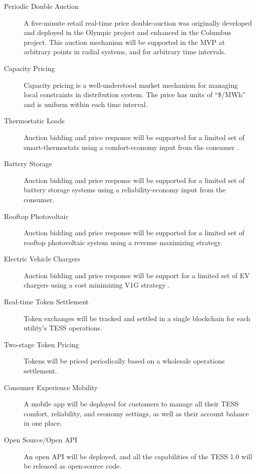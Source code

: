 \documentclass[10pt,twocolumn]{article}
\begin{document}
\begin{description}

    \item[Periodic Double Auction] A five-minute retail real-time price double-auction was originally developed and deployed in the Olympic project and enhanced in the Columbus project. This auction mechanism will be supported in the MVP at arbitrary points in radial systems, and for arbitrary time intervals.
    
    \item[Capacity Pricing] Capacity pricing is a well-understood market mechanism for managing local constraints in distribution system.  The price has units of ``\$/MWh'' and is uniform within each time interval.
    
    \item[Thermostatic Loads] Auction bidding and price response will be supported for a limited set of smart-thermostats using a comfort-economy input from the consumer \cite{hammerstrom2007}.
    
    \item[Battery Storage] Auction bidding and price response will be supported for a limited set of battery storage systems using a reliability-economy input from the consumer.
    
    \item[Rooftop Photovoltaic] Auction bidding and price response will be supported for a limited set of rooftop photovoltaic system using a revenue maximizing strategy.
    
    \item[Electric Vehicle Chargers] Auction bidding and price response will be support for a limited set of EV chargers using a cost minimizing V1G strategy \cite{behboodi2016}.
    
    \item[Real-time Token Settlement] Token exchanges will be tracked and settled in a single blockchain for each utility's TESS operations.
    
    \item[Two-stage Token Pricing] Tokens will be priced periodically based on a wholesale operations settlement.
    
    \item[Consumer Experience Mobility] A mobile app will be deployed for customers to manage all their TESS comfort, reliability, and economy settings, as well as their account balance in one place.

    \item[Open Source/Open API] An open API will be deployed, and all the capabilities of the TESS 1.0 will be released as open-source code.
        
\end{description}
\end{document}
